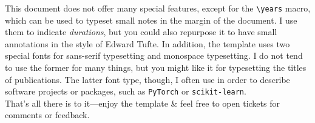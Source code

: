 \documentclass[letter,11pt]{article} %
\newcommand{\years}[1]{%
  {\reversemarginpar\strut\marginnote{{\small#1}}}%
}
\begin{document}
This document does not offer many special features, except for the
\verb|\years| macro, which can be used to typeset small notes in the
margin of the document. I use them to indicate \emph{durations}, but you
could also repurpose it to have small annotations in the style of Edward
Tufte. In addition, the template uses two special fonts for sans-serif
typesetting and monospace typesetting. I do not tend to use the former
for many things, but you might like it for typesetting the titles of
publications. The latter font type, though, I often use in order to
describe software projects or packages, such as \texttt{PyTorch} or
\texttt{scikit-learn}.\\

That's all there is to it---enjoy the template \& feel free to open
tickets for comments or feedback.
\end{document}
